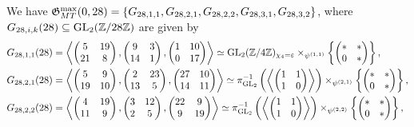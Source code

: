 We have $\mathfrak{G}_{MT}^{\max}(0,28) = \{ G_{28,1,1}, G_{28,2,1}, G_{28,2,2}, G_{28,3,1}, G_{28,3,2} \}$, where $G_{28,i,k}(28) \subseteq \operatorname{GL}_2(\mathbb{Z}/28\mathbb{Z})$ are given by
\begin{equation} \label{descriptionofgroupslevel28}
\begin{split}
G_{28,1,1}(28) &= \left\langle \begin{pmatrix} 5 & 19 \\ 21 & 8 \end{pmatrix}, \begin{pmatrix} 9 & 3 \\ 14 & 1 \end{pmatrix}, \begin{pmatrix} 1 & 10 \\ 0 & 17 \end{pmatrix} \right\rangle \simeq \GL_2(\mbz/4\mbz)_{\chi_4 = \ve} \times_{\psi^{(1,1)}} \left\{ \begin{pmatrix} * & * \\ 0 & * \end{pmatrix} \right\}, \\
G_{28,2,1}(28) &= \left\langle \begin{pmatrix} 5 & 9 \\ 19 & 10 \end{pmatrix}, \begin{pmatrix} 2 & 23 \\ 13 & 5 \end{pmatrix}, \begin{pmatrix} 27 & 10 \\ 14 & 11 \end{pmatrix} \right\rangle\simeq \pi_{\GL_2}^{-1} \left( \left\langle \begin{pmatrix} 1 & 1 \\ 1 & 0 \end{pmatrix} \right\rangle \right) \times_{\psi^{(2,1)}} \left\{ \begin{pmatrix} * & * \\ 0 & * \end{pmatrix} \right\}, \\
G_{28,2,2}(28) &= \left\langle \begin{pmatrix} 4 & 19 \\ 11 & 9 \end{pmatrix}, \begin{pmatrix} 3 & 12 \\ 2 & 5 \end{pmatrix}, \begin{pmatrix} 22 & 9 \\ 9 & 19 \end{pmatrix} \right\rangle \simeq \pi_{\GL_2}^{-1} \left( \left\langle \begin{pmatrix} 1 & 1 \\ 1 & 0 \end{pmatrix} \right\rangle \right) \times_{\psi^{(2,2)}} \left\{ \begin{pmatrix} * & * \\ 0 & * \end{pmatrix} \right\}, \\

\end{split}
\end{equation}
